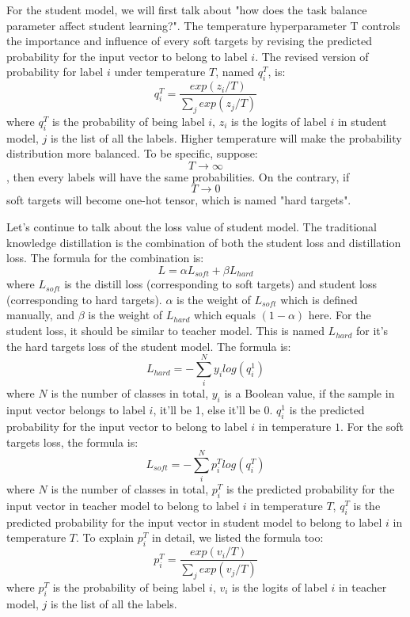 \documentclass[conference]{IEEEtran}
\begin{document}
For the student model, we will first talk about "how does the task balance parameter affect student learning?".
The temperature hyperparameter T controls the importance and influence of every soft targets by revising the predicted probability for the input vector to belong to label $i$. The revised version of probability for label $i$ under temperature $T$, named $q_{i}^{T}$, is:
$$q_{i}^{T}=\frac{exp(z_{i}/T)}{\sum_{j}exp(z_{j}/T)}$$
where $q_{i}^{T}$ is the probability of being label $i$, $z_{i}$ is the logits of label $i$ in student model, $j$ is the list of all the labels.
Higher temperature will make the probability distribution more balanced. To be specific, suppose: $$T\to \infty $$, then every labels will have the same probabilities. 
On the contrary, if $$T\to 0 $$ soft targets will become one-hot tensor, which is named "hard targets".\par
Let's continue to talk about the loss value of student model. The traditional knowledge distillation is the combination of both the student loss and distillation loss.
The formula for the combination is:
$$L=\alpha L_{soft}+\beta L_{hard}$$
where $L_{soft}$ is the distill loss (corresponding to soft targets) and student loss (corresponding to hard targets). $\alpha$ is the weight of $L_{soft}$ which is defined manually, and $\beta$ is the weight of $L_{hard}$ which equals $(1-\alpha)$ here.
For the student loss, it should be similar to teacher model. This is named $L_{hard}$ for it's the hard targets loss of the student model. The formula is:
$$L_{hard}=-\sum_{i}^{N}y_{i}log(q_{i}^{1})$$
where $N$ is the number of classes in total, $y_{i}$ is a Boolean value, if the sample in input vector belongs to label $i$, it'll be 1, else it'll be 0. $q_{i}^{1}$ is the predicted probability for the input vector to belong to label $i$ in temperature $1$.
For the soft targets loss, the formula is:
$$L_{soft}=-\sum_{i}^{N}p_{i}^{T}log(q_{i}^{T})$$
where $N$ is the number of classes in total, $p_{i}^{T}$ is the predicted probability for the input vector in teacher model to belong to label $i$ in temperature $T$, $q_{i}^{T}$ is the predicted probability for the input vector in student model to belong to label $i$ in temperature $T$.
To explain $p_{i}^{T}$ in detail, we listed the formula too:
$$p_{i}^{T}=\frac{exp(v_{i}/T)}{\sum_{j}exp(v_{j}/T)}$$
where $p_{i}^{T}$ is the probability of being label $i$, $v_{i}$ is the logits of label $i$ in teacher model, $j$ is the list of all the labels.
\end{document}

